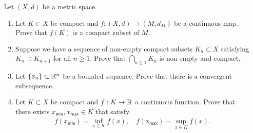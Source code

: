 \documentclass[12pt]{article}
\begin{document}
\begin{problem} \label{problem-1.21}
	Let $(X, d)$ be a metric space.
        \begin{enumerate}[label = (\alph*)]
            \item Let $K \subset X$ be compact and $f : (X, d) \to (M, d_M)$ be a continuous map. Prove that $f(K)$ is a compact subset of $M$.
            \item Suppose we have a sequence of non-empty compact subsets $K_n \subset X$ satisfying $K_n \supset K_{n+1}$ for all $n \geq 1$. Prove that $\bigcap_{n \geq 1} K_n$ is non-empty and compact. 
            \item Let $\{x_n\} \subset \mathbb{R}^n$ be a bounded sequence. Prove that there is a convergent subsequence.
            \item Let $K \subset X$ be compact and $f : K \to \mathbb{R}$ a continuous function. Prove that there exists $x_{\mathsf{min}}, x_{\mathsf{max}} \in K$ that satisfy
            \begin{align*}
                    f(x_{\mathsf{min}}) = \inf_{x \in K} f(x), \quad f(x_{\mathsf{max}}) = \sup_{x \in K} f(x). 
            \end{align*}
        \end{enumerate}   
\end{problem}
\end{document}
